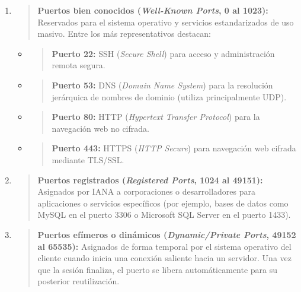 \begin{enumerate}
\def\labelenumi{\arabic{enumi}.}
\item
  \begin{quote}
  \textbf{Puertos bien conocidos (\emph{Well-Known Ports}, 0 al 1023):}
  Reservados para el sistema operativo y servicios estandarizados de uso
  masivo. Entre los más representativos destacan:
  \end{quote}

  \begin{itemize}
  \item
    \begin{quote}
    \textbf{Puerto 22:} SSH (\emph{Secure Shell}) para acceso y
    administración remota segura.
    \end{quote}
  \item
    \begin{quote}
    \textbf{Puerto 53:} DNS (\emph{Domain Name System}) para la
    resolución jerárquica de nombres de dominio (utiliza principalmente
    UDP).
    \end{quote}
  \item
    \begin{quote}
    \textbf{Puerto 80:} HTTP (\emph{Hypertext Transfer Protocol}) para
    la navegación web no cifrada.
    \end{quote}
  \item
    \begin{quote}
    \textbf{Puerto 443:} HTTPS (\emph{HTTP Secure}) para navegación web
    cifrada mediante TLS/SSL.
    \end{quote}
  \end{itemize}
\item
  \begin{quote}
  \textbf{Puertos registrados (\emph{Registered Ports}, 1024 al 49151):}
  Asignados por IANA a corporaciones o desarrolladores para aplicaciones
  o servicios específicos (por ejemplo, bases de datos como MySQL en el
  puerto 3306 o Microsoft SQL Server en el puerto 1433).
  \end{quote}
\item
  \begin{quote}
  \textbf{Puertos efímeros o dinámicos (\emph{Dynamic/Private Ports},
  49152 al 65535):} Asignados de forma temporal por el sistema operativo
  del cliente cuando inicia una conexión saliente hacia un servidor. Una
  vez que la sesión finaliza, el puerto se libera automáticamente para
  su posterior reutilización.
  \end{quote}
\end{enumerate}


